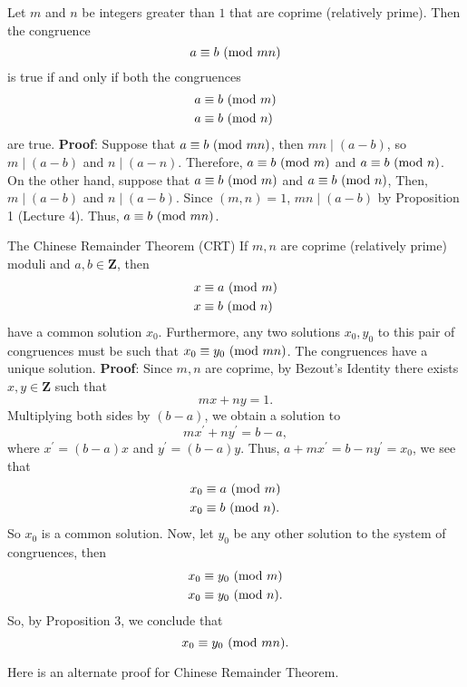 \begin{Proposition}{}{}
    Let $m$ and $n$ be integers greater than $1$ that are coprime (relatively prime). Then the congruence
    \[ a\equiv b\ (\mathrm{mod}\ mn) \]
    is true if and only if both the congruences
    \begin{align*}
        a & \equiv b\ (\mathrm{mod}\ m) \\
        a & \equiv b\ (\mathrm{mod}\ n)
    \end{align*}
    are true.
    \tcblower{}
    \textbf{Proof}: Suppose that $ a\equiv b\ (\mathrm{mod}\ mn) $, then $ mn\mid (a-b) $, so $ m\mid (a-b) $ and $ n\mid (a-n) $.
    Therefore, $ a\equiv b\ (\mathrm{mod}\ m) $ and $ a\equiv b\ (\mathrm{mod}\ n) $. On the other hand, suppose that $ a\equiv b\ (\mathrm{mod}\ m) $ and $ a\equiv b\ (\mathrm{mod}\ n) $,
    Then, $ m\mid (a-b) $ and $ n\mid (a-b) $. Since $ (m,n)=1 $, $ mn\mid (a-b) $ by Proposition 1 (Lecture 4). Thus, $ a\equiv b\ (\mathrm{mod}\ mn) $.
\end{Proposition}
\begin{Theorem}{The Chinese Remainder Theorem (CRT)}{}
    If $ m,n $ are coprime (relatively prime) moduli and $ a,b\in\mathbf{Z} $, then
    \begin{align*}
        x & \equiv a\ (\mathrm{mod}\ m) \\
        x & \equiv b\ (\mathrm{mod}\ n)
    \end{align*}
    have a common solution $ x_0 $. Furthermore, any two solutions $ x_0,y_0 $ to this pair of
    congruences must be such that $ x_0\equiv y_0\ (\mathrm{mod}\ mn) $. The congruences have a unique
    solution.
    \tcblower{}
    \textbf{Proof}: Since $ m,n $ are coprime, by Bezout's Identity there exists $ x,y\in\mathbf{Z} $ such that
    \[ mx+ny=1. \]
    Multiplying both sides by $ (b-a) $, we obtain a solution to
    \[ mx^\prime+ny^\prime=b-a, \]
    where $ x^\prime=(b-a)x $ and $ y^\prime=(b-a)y $. Thus, $ a+mx^\prime=b-ny^\prime=x_0 $, we see that
    \begin{align*}
        x_0 & \equiv a\ (\mathrm{mod}\ m)  \\
        x_0 & \equiv b\ (\mathrm{mod}\ n).
    \end{align*}
    So $ x_0 $ is a common solution. Now, let $ y_0 $ be any other solution to the system of congruences, then
    \begin{align*}
        x_0 & \equiv y_0\ (\mathrm{mod}\ m)  \\
        x_0 & \equiv y_0\ (\mathrm{mod}\ n).
    \end{align*}
    So, by Proposition 3, we conclude that
    \[ x_0\equiv y_0\ (\mathrm{mod}\ mn). \]
\end{Theorem}
Here is an alternate proof for Chinese Remainder Theorem.


